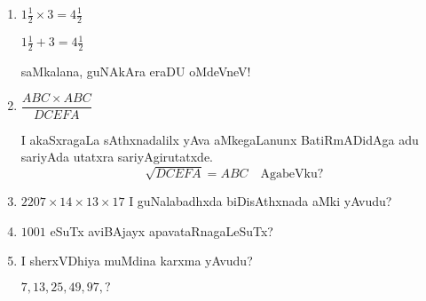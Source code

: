 \begin{enumerate}
\item $1\frac{1}{2}\times 3=4\frac{1}{2}$

$1\frac{1}{2}+3=4\frac{1}{2}$

saMkalana, guNAkAra eraDU oMdeVneV!

\item $\dfrac{ABC\times ABC}{DCEFA}$

I akaSxragaLa sAthxnadalilx yAva aMkegaLanunx BatiRmADidAga adu sariyAda utatxra sariyAgirutatxde. 
$$
\sqrt{DCEFA}=ABC\quad\text{AgabeVku?}
$$

\item $2207\times 14\times 13\times 17$ I guNalabadhxda biDisAthxnada aMki yAvudu?

\item $1001$ eSuTx aviBAjayx apavataRnagaLeSuTx?

\item I sherxVDhiya muMdina karxma yAvudu?

$7,13,25,49,97,?$

\end{enumerate}
